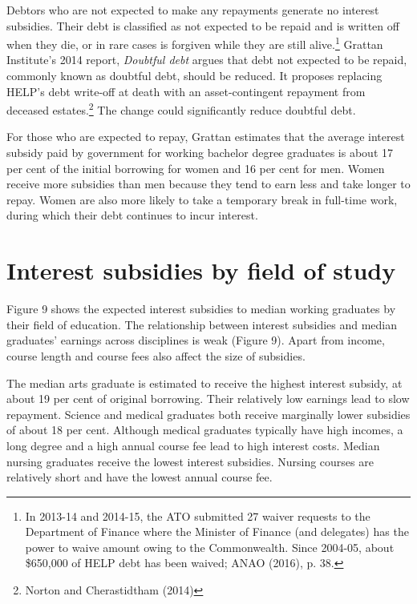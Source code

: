 \documentclass[]{book}
\begin{document}
Debtors who are not expected to make any repayments generate no interest subsidies. Their debt is classified as not expected to be repaid and is written off when they die, or in rare cases is forgiven while they are still alive.\footnote{In 2013-14 and 2014-15, the ATO submitted 27 waiver requests to the Department of Finance where the Minister of Finance (and delegates) has the power to waive amount owing to the Commonwealth. Since 2004-05, about \$650,000 of HELP debt has been waived; ANAO (2016), p. 38.} Grattan Institute's 2014 report, \emph{Doubtful debt} argues that debt not expected to be repaid, commonly known as doubtful debt, should be reduced. It proposes replacing HELP's debt write-off at death with an asset-contingent repayment from deceased estates.\footnote{Norton and Cherastidtham (2014)} The change could significantly reduce doubtful debt.

For those who are expected to repay, Grattan estimates that the average interest subsidy paid by government for working bachelor degree graduates is about 17 per cent of the initial borrowing for women and 16 per cent for men. Women receive more subsidies than men because they tend to earn less and take longer to repay. Women are also more likely to take a temporary break in full-time work, during which their debt continues to incur interest.

\section{Interest subsidies by field of study}\label{interest-subsidies-by-field-of-study}

Figure 9 shows the expected interest subsidies to median working graduates by their field of education. The relationship between interest subsidies and median graduates' earnings across disciplines is weak (Figure 9). Apart from income, course length and course fees also affect the size of subsidies.

The median arts graduate is estimated to receive the highest interest subsidy, at about 19 per cent of original borrowing. Their relatively low earnings lead to slow repayment. Science and medical graduates both receive marginally lower subsidies of about 18 per cent. Although medical graduates typically have high incomes, a long degree and a high annual course fee lead to high interest costs. Median nursing graduates receive the lowest interest subsidies. Nursing courses are relatively short and have the lowest annual course fee.
\end{document}
